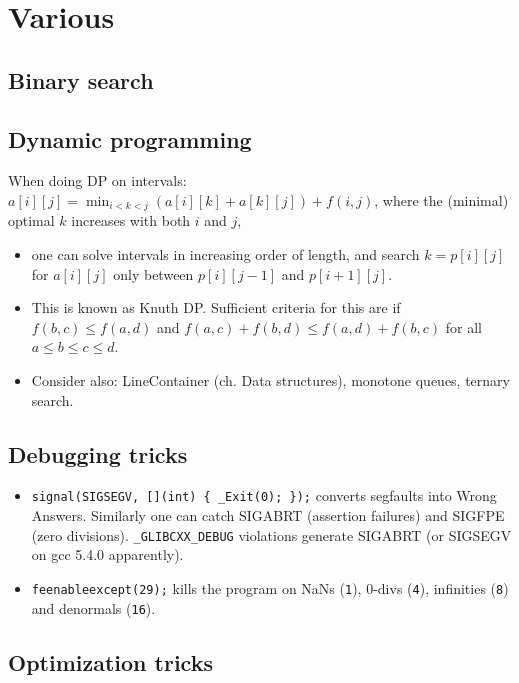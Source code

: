 \chapter{Various}

\section{Binary search}

\section{Dynamic programming}

When doing DP on intervals: $a[i][j] = \min_{i < k < j}(a[i][k] + a[k][j]) + f(i, j)$, where the (minimal) optimal $k$ increases with both $i$ and $j$,
\begin{itemize}
\item one can solve intervals in increasing order of length, and search $k = p[i][j]$ for $a[i][j]$ only between $p[i][j-1]$ and $p[i+1][j]$.
\item This is known as Knuth DP. Sufficient criteria for this are if $f(b,c) \le f(a,d)$ and $f(a,c) + f(b,d) \le f(a,d) + f(b,c)$ for all $a \le b \le c \le d$.
\item Consider also: LineContainer (ch. Data structures), monotone queues, ternary search.
\end{itemize}


\section{Debugging tricks}
	\begin{itemize}
		\item \texttt{signal(SIGSEGV, [](int) \{ \_Exit(0); \});} converts segfaults into Wrong Answers.
			Similarly one can catch SIGABRT (assertion failures) and SIGFPE (zero divisions).
			\texttt{\_GLIBCXX\_DEBUG} violations generate SIGABRT (or SIGSEGV on gcc 5.4.0 apparently).
		\item \texttt{feenableexcept(29);} kills the program on NaNs (\texttt 1), 0-divs (\texttt 4), infinities (\texttt 8) and denormals (\texttt{16}).
	\end{itemize}

\section{Optimization tricks}
